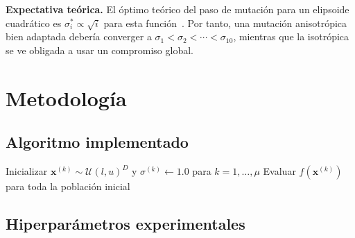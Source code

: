 \documentclass[12pt,letterpaper]{article}
\begin{document}
\begin{notebox}
\textbf{Expectativa teórica.} El óptimo teórico del paso de mutación para un elipsoide cuadrático es $\sigma_i^{*}\propto \sqrt{i}$ para esta función~\cite{beyer2001}. Por tanto, una mutación anisotrópica bien adaptada debería converger a $\sigma_1<\sigma_2<\cdots<\sigma_{10}$, mientras que la isotrópica se ve obligada a usar un compromiso global.
\end{notebox}

\newpage
\section{Metodología}

\subsection{Algoritmo implementado}

\begin{algorithm}[H]
\DontPrintSemicolon
\SetAlgoLined
{}
Inicializar $\mathbf{x}^{(k)}\sim\mathcal{U}(l,u)^D$ y $\sigma^{(k)}\leftarrow 1.0$ para $k=1,\dots,\mu$\;
Evaluar $f(\mathbf{x}^{(k)})$ para toda la población inicial\;
\;
\caption{Estrategia Evolutiva auto-adaptativa (un padre por descendiente)}
\label{alg:ee}
\end{algorithm}

\subsection{Hiperparámetros experimentales}
\end{document}
